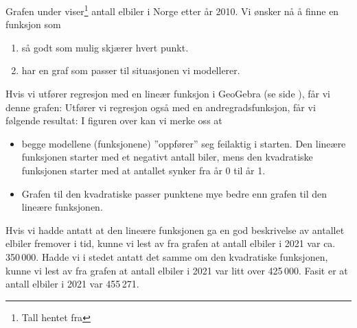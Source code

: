 Grafen under viser\footnote{Tall hentet fra } antall elbiler i Norge etter år 2010.
Vi ønsker nå å finne en funksjon som
\begin{enumerate}[label=(\roman*)]
	\item så godt som mulig skjærer hvert punkt.
	\item har en graf som passer til situasjonen vi modellerer.
\end{enumerate}
Hvis vi utfører regresjon med en lineær funksjon i GeoGebra (se side \pageref{ggbreg}), får vi denne grafen:
Utfører vi regresjon også med en andregradsfunksjon, får vi følgende resultat:
I figuren over kan vi merke oss at
\begin{itemize}
	\item begge modellene (funksjonene) ''oppfører'' seg feilaktig i starten. Den lineære funksjonen starter med et negativt antall biler, mens den kvadratiske funksjonen starter med at antallet synker fra år 0 til år 1.
	\item Grafen til den kvadratiske passer punktene mye bedre enn grafen til den lineære funksjonen.
\end{itemize}
Hvis vi hadde antatt at den lineære funksjonen ga en god beskrivelse av antallet elbiler fremover i tid, kunne vi lest av fra grafen at antall elbiler i 2021 var ca. 350\,000. Hadde vi i stedet antatt det samme om den kvadratiske funksjonen, kunne vi lest av fra grafen at antall elbiler i 2021 var litt over 425\,000. Fasit er at antall elbiler i 2021 var 455\,271.
\newpage



